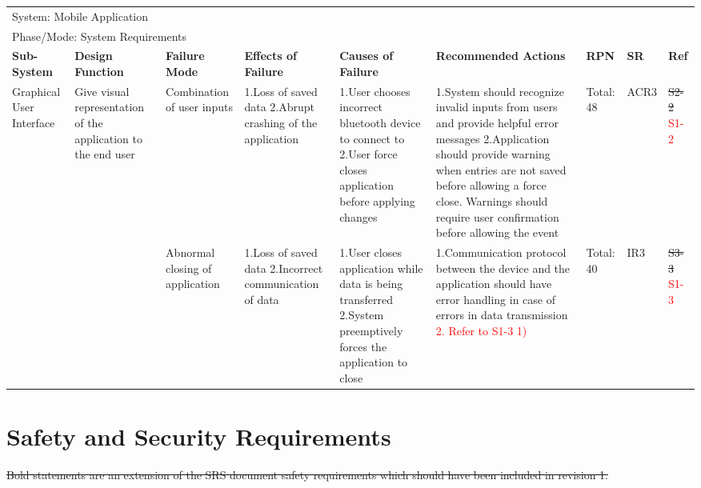 \documentclass[12pt, titlepage]{article}
\begin{document}
\begin{landscape}
\begin{table}[H]
\begin{tabular}{| p{} | p{}  | p{} | p{} | p{} | p{} | p{} | p{} | p{} |}
    \multicolumn{9}{|l|}{System: Mobile Application } \\
    \multicolumn{9}{|l|}{Phase/Mode: System Requirements} \\ \hline
    \textbf{Sub-System} & \textbf{Design Function} & \textbf{Failure Mode} & \textbf{Effects of Failure} & \textbf{Causes of Failure} & \textbf{Recommended Actions} & \textbf{RPN} & \textbf{SR} & \textbf{Ref} \\ \hline

    Graphical User Interface & Give visual representation of the application to the end user & Combination of user inputs & 1.Loss of saved data \newline 2.Abrupt crashing of the application  &  1.User chooses incorrect bluetooth device to connect to \newline 2.User force closes application before applying changes  &  1.System should recognize invalid inputs from users and provide helpful error messages \newline 2.Application should provide warning when entries are not saved before allowing a force close. Warnings should require user confirmation before allowing the event  & Total: 48 & ACR3 & \sout{S2-2} \textcolor{red}{S1-2} \\ \cline{3-9}

     & & Abnormal closing of application & 1.Loss of saved data \newline 2.Incorrect communication of data  & 1.User closes application while data is being transferred \newline 2.System preemptively forces the application to close & 1.Communication protocol between the device and the application should have error handling in case of errors in data transmission \newline \textcolor{red}{2. Refer to S1-3 1)}  & Total: 40 & IR3 & \sout{S3-3} \textcolor{red}{S1-3} \\ \hline
    
    \end{tabular}
    
\end{table}

\end{landscape}

\section{Safety and Security Requirements}

\sout{Bold statements are an extension of the SRS document safety requirements which should have been included in revision 1.}
\end{document}
